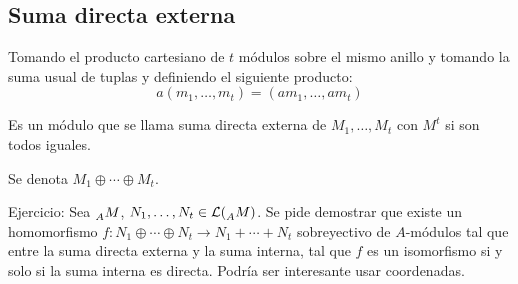 \subsection{Suma directa externa}

\begin{df}
Tomando el producto cartesiano de \(t\) módulos sobre el mismo anillo
y tomando la suma usual de tuplas y definiendo el siguiente producto:
\[
  a(m_1,\ldots, m_t)=(am_1,\ldots,am_t)
\]

Es un módulo que se llama suma directa externa de \(M_1,\ldots, M_t\)
con \(M^t\) si son todos iguales.

  Se denota \(M_1\oplus\cdots\oplus M_t\).
\end{df}


Ejercicio: Sea \(\prescript{}{A}{M}\), \(N_1,\ldots,
N_t\in\mathcal{L}(\prescript{}{A}{M})\). Se pide demostrar que existe
un homomorfismo \(f:N_1\oplus\cdots\oplus N_t\longrightarrow
N_1{+}\cdots{+}N_t\)
sobreyectivo de \(A\)-módulos tal que entre la suma directa
externa y la suma interna, tal que \(f\) es un isomorfismo si y solo si
la suma interna es directa. Podría ser interesante usar coordenadas.
